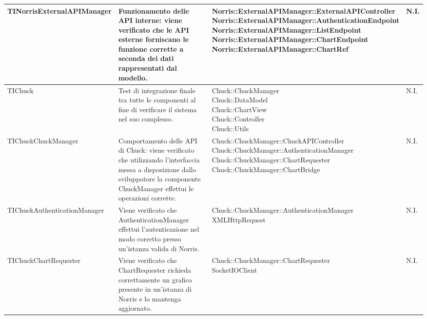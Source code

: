 \begin{longtabu}{| X | X | X | X[0.5] |}
	TINorrisExternalAPIManager
	&
Funzionamento delle API interne: viene verificato che le API esterne forniscano le funzione corrette a seconda dei dati rappresentati dal modello.
& \parbox[t]{0.6\textwidth}{
Norris::ExternalAPIManager::ExternalAPIController\\
Norris::ExternalAPIManager::AuthenticationEndpoint\\
Norris::ExternalAPIManager::ListEndpoint\\
Norris::ExternalAPIManager::ChartEndpoint\\
Norris::ExternalAPIManager::ChartRef}
			& N.I.
			\\ \hline











	TIChuck
				&
Test di integrazione finale tra tutte le componenti al fine di verificare il sistema nel suo complesso.
			& \parbox[t]{0.6\textwidth}{
Chuck::ChuckManager\\
Chuck::DataModel\\
Chuck::ChartView\\
Chuck::Controller\\
Chuck::Utils}
			& N.I.
			\\ \hline



	TIChuckChuckManager
				&
Comportamento delle API di Chuck: viene verificato che utilizzando l'interfaccia messa a disposizione dallo sviluppatore la componente ChuckManager effettui le operazioni corrette.
			& \parbox[t]{0.6\textwidth}{
Chuck::ChuckManager::ChuckAPIController\\
Chuck::ChuckManager::AuthenticationManager\\
Chuck::ChuckManager::ChartRequester\\
Chuck::ChuckManager::ChartBridge}
			& N.I.
			\\ \hline


	
	TIChuckAuthenticationManager
				&
Viene verificato che AuthenticationManager effettui l'autenticazione nel modo corretto presso un'istanza valida di Norris.
			& \parbox[t]{0.6\textwidth}{
Chuck::ChuckManager::AuthenticationManager\\
XMLHttpRequest}
			& N.I.
			\\ \hline



	TIChuckChartRequester
				&
Viene verificato che ChartRequester richieda correttamente un grafico presente in un'istanza di Norris e lo mantenga aggiornato.
			& \parbox[t]{0.6\textwidth}{
Chuck::ChuckManager::ChartRequester\\
SocketIOClient}
			& N.I.
			\\ \hline




\end{longtabu}
